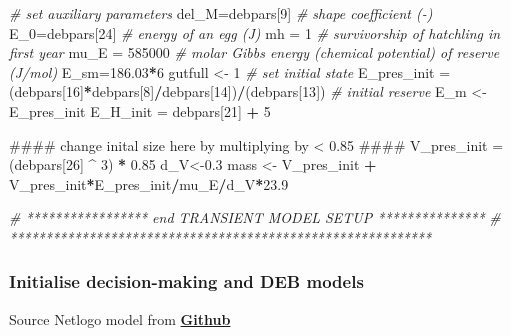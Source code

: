 \documentclass[]{article}
\newenvironment{Shaded}{\begin{snugshade}}{\end{snugshade}}
\newcommand{\DecValTok}[1]{\textcolor[rgb]{0.00,0.00,0.81}{#1}}
\newcommand{\FloatTok}[1]{\textcolor[rgb]{0.00,0.00,0.81}{#1}}
\newcommand{\StringTok}[1]{\textcolor[rgb]{0.31,0.60,0.02}{#1}}
\newcommand{\CommentTok}[1]{\textcolor[rgb]{0.56,0.35,0.01}{\textit{#1}}}
\newcommand{\OperatorTok}[1]{\textcolor[rgb]{0.81,0.36,0.00}{\textbf{#1}}}
\newcommand{\NormalTok}[1]{#1}
\begin{document}
\begin{Shaded}
\begin{Highlighting}[]
\CommentTok{# set auxiliary parameters}
\NormalTok{del_M=debpars[}\DecValTok{9}\NormalTok{] }\CommentTok{# shape coefficient (-) }
\NormalTok{E_}\DecValTok{0}\NormalTok{=debpars[}\DecValTok{24}\NormalTok{] }\CommentTok{# energy of an egg (J)}
\NormalTok{mh =}\StringTok{ }\DecValTok{1} \CommentTok{# survivorship of hatchling in first year}
\NormalTok{mu_E =}\StringTok{ }\DecValTok{585000} \CommentTok{# molar Gibbs energy (chemical potential) of reserve (J/mol)}
\NormalTok{E_sm=}\FloatTok{186.03}\OperatorTok{*}\DecValTok{6}
\NormalTok{gutfull <-}\StringTok{ }\DecValTok{1}
\CommentTok{# set initial state}
\NormalTok{E_pres_init =}\StringTok{ }\NormalTok{(debpars[}\DecValTok{16}\NormalTok{]}\OperatorTok{*}\NormalTok{debpars[}\DecValTok{8}\NormalTok{]}\OperatorTok{/}\NormalTok{debpars[}\DecValTok{14}\NormalTok{])}\OperatorTok{/}\NormalTok{(debpars[}\DecValTok{13}\NormalTok{]) }\CommentTok{# initial reserve}
\NormalTok{E_m <-}\StringTok{ }\NormalTok{E_pres_init}
\NormalTok{E_H_init =}\StringTok{ }\NormalTok{debpars[}\DecValTok{21}\NormalTok{] }\OperatorTok{+}\StringTok{ }\DecValTok{5}

\NormalTok{#### change inital size here by multiplying by < 0.85 ####}
\NormalTok{V_pres_init =}\StringTok{ }\NormalTok{(debpars[}\DecValTok{26}\NormalTok{] }\OperatorTok{^}\StringTok{ }\DecValTok{3}\NormalTok{) }\OperatorTok{*}\StringTok{ }\FloatTok{0.85} 
\NormalTok{d_V<-}\FloatTok{0.3}
\NormalTok{mass <-}\StringTok{ }\NormalTok{V_pres_init }\OperatorTok{+}\StringTok{ }\NormalTok{V_pres_init}\OperatorTok{*}\NormalTok{E_pres_init}\OperatorTok{/}\NormalTok{mu_E}\OperatorTok{/}\NormalTok{d_V}\OperatorTok{*}\FloatTok{23.9}

\CommentTok{# ***************** end TRANSIENT MODEL SETUP ***************}
\CommentTok{# ***********************************************************}
\end{Highlighting}
\end{Shaded}

\subsubsection{Initialise decision-making and DEB
models}\label{initialise-decision-making-and-deb-models}

Source Netlogo model from
\href{\%22https://github.com/darwinanddavis/MalishevBullKearney\%22}{\textbf{Github}}
\end{document}
